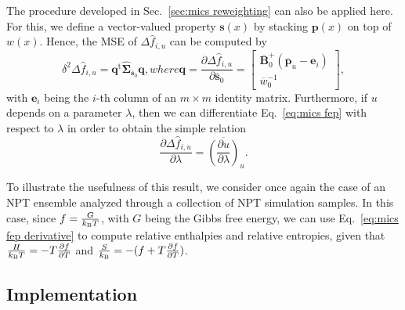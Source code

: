 \documentclass[
    journal=jctcce,
    layout=twocolumn
]{achemso}
\newcommand{\mt}[1]{\boldsymbol{\mathbf{#1}}}   %
\newcommand{\vt}[1]{\boldsymbol{\mathbf{#1}}}   %
\newcommand{\tr}[1]{#1^\text{t}}                %
\newcommand{\diff}[2]{\frac{\partial #2}{\partial #1}} %
\newcommand{\avg}[1]{\overline{#1}}             %
\begin{document}
The procedure developed in Sec.~\ref{sec:mics reweighting} can also be applied here. For this, we define a vector-valued property $\vt s(x)$ by stacking $\vt p(x)$ on top of $w(x)$. Hence, the MSE of $\Delta {\hat f}_{i,u}$ can be computed by
\begin{subequations}
	\label{eq:mics fep uncertainty}
	\begin{equation}
	\label{eq:mics fep delta method}
	\delta^2 \Delta {\hat f}_{i,u} = \tr{\vt q} \hat{\mt \Sigma}_{\avg{\vt s}_0} {\vt q},
	\end{equation}
	where
	\begin{equation}
	\label{eq:mics fep gradient}
	{\vt q} = \diff{\avg{\vt s}_0}{\Delta {\hat f}_{i,u}} =
	\left[\begin{array}{c}
	\avg{\mt B}_0^+  (\avg{\vt p}_u - {\vt e}_i) \\
	\avg{w}_0^{-1}
	\end{array}\right],
	\end{equation}
\end{subequations}
with $\vt e_i$ being the $i$-th column of an $m \times m$ identity matrix. Furthermore, if $u$ depends on a parameter $\lambda$, then we can differentiate Eq.~\eqref{eq:mics fep} with respect to $\lambda$ in order to obtain the simple relation
\begin{equation}
\label{eq:mics fep derivative}
\frac{\partial \Delta {\hat f}_{i,u}}{\partial \lambda} = \avg{\left(\frac{\partial u}{\partial \lambda}\right)}_u.
\end{equation}

To illustrate the usefulness of this result, we consider once again the case of an NPT ensemble analyzed through a collection of NPT simulation samples. In this case, since $f = \frac{G}{k_\text{\tiny B} T}$, with $G$ being the Gibbs free energy, we can use Eq.~\eqref{eq:mics fep derivative} to compute relative enthalpies and relative entropies, given that $\frac{H}{k_\text{\tiny B} T} = - T \frac{\partial f}{\partial T}$ and $\frac{S}{k_\text{\tiny B}} = -(f + T \frac{\partial f}{\partial T})$.

\subsection{Implementation}
\end{document}
